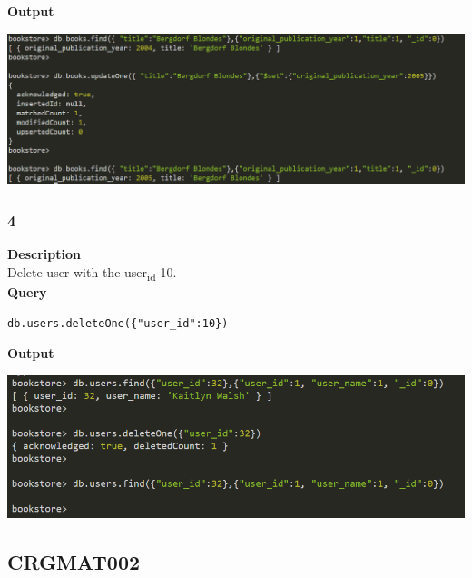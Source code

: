 \documentclass[11pt]{article}
\begin{document}
\linebreak
\textbf{Output}\\
\begin{center}
\includegraphics[width=1\textwidth]{images/MRCGAB004/3.png}
\end{center}
\pagebreak
\subsubsection{4}
\label{sec:org35e4299}
\textbf{Description}\\
Delete user with the user\textsubscript{id} 10.\\
\linebreak
\textbf{Query}
\begin{verbatim}
db.users.deleteOne({"user_id":10})
\end{verbatim}

\linebreak
\textbf{Output}\\
\begin{center}
\includegraphics[width=1\textwidth]{images/MRCGAB004/4.png}
\end{center}
\pagebreak
\subsection{CRGMAT002}
\label{sec:org7c555a6}
\end{document}
